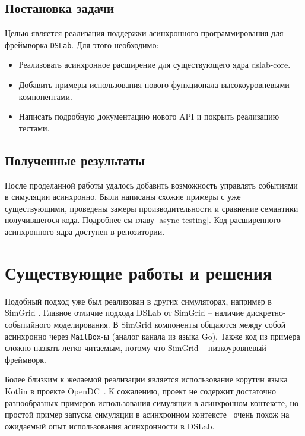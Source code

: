 \subsection{Постановка задачи}\label{main-purpose}
Целью является реализация поддержки асинхронного программирования для фреймворка \texttt{DSLab}. Для этого необходимо:
\begin{itemize}
    \item Реализовать асинхронное расширение для существующего ядра dslab-core.
    \item Добавить примеры использования нового функционала высокоуровневыми компонентами.
    \item Написать подробную документацию нового API и покрыть реализацию тестами.
\end{itemize}

\subsection{Полученные результаты}

После проделанной работы удалось добавить возможность управлять событиями в симуляции асинхронно. Были написаны схожие примеры с уже существующими, проведены замеры производительности и сравнение семантики получившегося кода. Подробнее см главу \ref{async-testing}. Код расширенного асинхронного ядра доступен в репозитории\cite{async-dslab-core}.


\section{Существующие работы и решения}

Подобный подход уже был реализован в других симуляторах, например в SimGrid \cite{simgrid-example}\cite{simgrid-article}. Главное отличие подхода DSLab от SimGrid -- наличие дискретно-событийного моделирования. В SimGrid компоненты общаются между собой асинхронно через \texttt{MailBox}-ы (аналог канала из языка Go). Также код из примера сложно назвать легко читаемым, потому что SimGrid -- низкоуровневый фреймворк. 

Более близким к желаемой реализации является использование корутин языка Kotlin в проекте OpenDC~\cite{opendc-repo}\cite{opendc-article}. К сожалению, проект не содержит достаточно разнообразных примеров использования симуляции в асинхронном контексте, но простой пример запуска симуляции в асинхронном контексте~\cite{opendc-example} очень похож на ожидаемый опыт использования асинхронности в DSLab.


